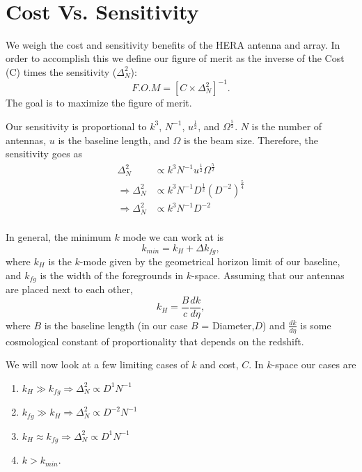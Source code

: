 \documentclass[11pt]{article}
\def\hf{\frac12}
\begin{document}
{ \\}
{
}
\vspace*{0.5cm}

\section{Cost Vs. Sensitivity}
    We weigh the cost and sensitivity benefits of the HERA antenna and array.
In order to accomplish this we define our figure of merit as the inverse of the
Cost (C) times the sensitivity ($\Delta_{N}^{2}$):
\begin{equation}
\label{eqn:fom}
    F.O.M = [C \times \Delta_{N}^{2}]^{-1}.
\end{equation}
The goal is to maximize the figure of merit.

Our sensitivity is proportional to $k^{3}$, $N^{-1}$, $u^{\frac{1}{2}}$, and
$\Omega^{\frac{5}{2}}$. $N$ is the number of antennas, $u$ is the baseline
length, and $\Omega$ is the beam size. Therefore, 
the sensitivity goes as
\begin{equation}
\begin{split}
    \Delta_{N}^{2} &\propto k^{3}N^{-1}u^{\frac{1}{2}} \Omega^{\frac{5}{2}} \\
    \Rightarrow \Delta_{N}^{2} &\propto k^{3}N^{-1} D^{\hf}
(D^{-2})^{\frac{5}{4}} \\ 
    \Rightarrow \Delta_{N}^{2} &\propto k^{3}N^{-1}D^{-2}\\
\end{split}
\end{equation}

In general, the minimum $k$ mode we can work at is 
\begin{equation}
    k_{min} = k_{H} + \Delta{k_{fg}},
\end{equation}
where $k_{H}$ is the $k$-mode given by the geometrical horizon limit of our
baseline, and $k_{fg}$ is the width of the foregrounds in $k$-space. Assuming
that our antennas are placed next to each other, 
\begin{equation}
\label{eqn:k_horizon}
    k_{H} = \frac{B}{c}\frac{dk}{d\eta},
\end{equation}
where $B$ is the baseline length (in our case $B$ = Diameter,$D$) and
$\frac{dk}{d\eta}$ is some cosmological constant of proportionality that depends
on the redshift.

We will now look at a few limiting cases of $k$ and cost, $C$. In $k$-space our
cases are 
\begin{enumerate}
    \item{$k_{H} \gg k_{fg} \Rightarrow \Delta_{N}^{2} \propto D^{1}N^{-1}$}
    \item{$k_{fg} \gg k_{H} \Rightarrow \Delta_{N}^{2} \propto D^{-2}N^{-1}$} 
    \item{$k_{H} \approx k_{fg} \Rightarrow \Delta_{N}^{2} \propto D^{1}N^{-1}$}
    \item{$k > k_{min}$.}
\end{enumerate}
\end{document}
